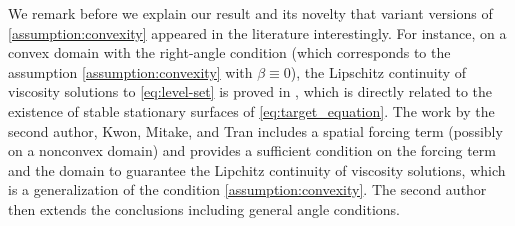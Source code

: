 \documentclass[11pt]{article}
\numberwithin{equation}{section}
\newcommand{\pOmega}[0]{\partial\Omega}
\newcommand{\sgrad}[0]{\nabla_{\pOmega}}
\def\leq{\leqslant}
\begin{document}



We remark before we explain our result and its novelty that variant versions of \eqref{assumption:convexity} appeared in the literature interestingly. For instance, on a convex domain with the right-angle condition (which corresponds to the assumption \eqref{assumption:convexity} with $\beta\equiv0$), the Lipschitz continuity of viscosity solutions to \eqref{eq:level-set} is proved in \cite{GOS99}, which is directly related to the existence of stable stationary surfaces of \eqref{eq:target_equation}.
The work \cite{JKMT22} by the second author, Kwon, Mitake, and Tran includes a spatial forcing term (possibly on a nonconvex domain) and provides a sufficient condition on the forcing term and the domain to guarantee the Lipchitz continuity of viscosity solutions, which is a generalization of the condition \eqref{assumption:convexity}. The second author \cite{J23} then extends the conclusions including general angle conditions.
\end{document}
